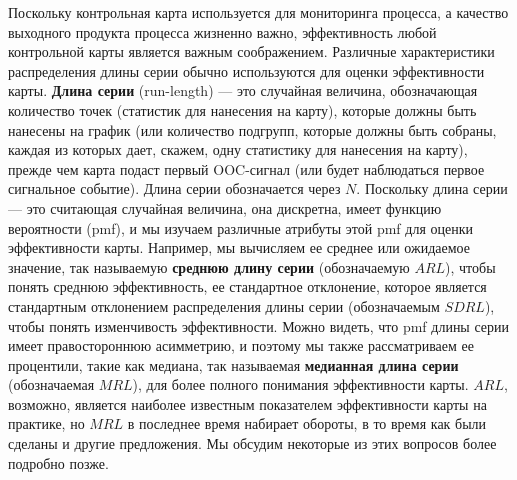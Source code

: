 Поскольку контрольная карта используется для мониторинга процесса, а качество выходного продукта процесса жизненно важно, эффективность любой контрольной карты является важным соображением. Различные характеристики распределения длины серии обычно используются для оценки эффективности карты. \textbf{Длина серии} (run-length) --- это случайная величина, обозначающая количество точек (статистик для нанесения на карту), которые должны быть нанесены на график (или количество подгрупп, которые должны быть собраны, каждая из которых дает, скажем, одну статистику для нанесения на карту), прежде чем карта подаст первый OOC-сигнал (или будет наблюдаться первое сигнальное событие). Длина серии обозначается через \(N\). Поскольку длина серии — это считающая случайная величина, она дискретна, имеет функцию вероятности (pmf), и мы изучаем различные атрибуты этой pmf для оценки эффективности карты. Например, мы вычисляем ее среднее или ожидаемое значение, так называемую \textbf{среднюю длину серии} (обозначаемую \(ARL\)), чтобы понять среднюю эффективность, ее стандартное отклонение, которое является стандартным отклонением распределения длины серии (обозначаемым \(SDRL\)), чтобы понять изменчивость эффективности. Можно видеть, что pmf длины серии имеет правостороннюю асимметрию, и поэтому мы также рассматриваем ее процентили, такие как медиана, так называемая \textbf{медианная длина серии} (обозначаемая \(MRL\)), для более полного понимания эффективности карты. \(ARL\), возможно, является наиболее известным показателем эффективности карты на практике, но \(MRL\) в последнее время набирает обороты, в то время как были сделаны и другие предложения. Мы обсудим некоторые из этих вопросов более подробно позже.

